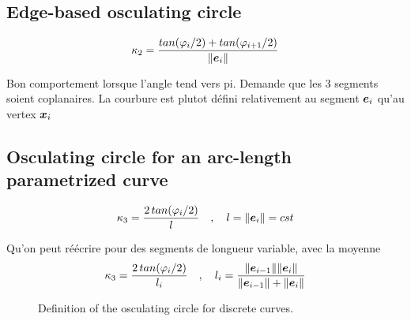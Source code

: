 \subsection{Edge-based osculating circle}

\begin{equation}
	\kappa_2 = \frac{tan(\varphi_i/2) + tan(\varphi_{i+1}/2)}{\lVert\boldsymbol{e}_{i}\rVert}
\end{equation}

Bon comportement lorsque l'angle tend vers pi. Demande que les 3 segments soient coplanaires.
La courbure est plutot défini relativement au segment $\boldsymbol{e}_i$ qu'au vertex $\boldsymbol{x}_i$

\subsection{Osculating circle for an arc-length parametrized curve}

\begin{equation}
	\kappa_3 = \frac{2 \,tan(\varphi_i/2)}{l}
	\quad , \quad 
	l = \lVert\boldsymbol{e}_{i}\rVert= cst
\end{equation}

Qu'on peut réécrire pour des segments de longueur variable, avec la moyenne
\begin{equation}
	\kappa_3 = \frac{2 \,tan(\varphi_i/2)}{l_i}
	\quad , \quad 
	l_i = \frac{\lVert\boldsymbol{e}_{i-1}\rVert \lVert\boldsymbol{e}_{i}\rVert}{\lVert\boldsymbol{e}_{i-1}\rVert + \lVert\boldsymbol{e}_{i}\rVert}
\end{equation}


\begin{figure}[h]
     \label{steady_state}
     \centering
     \caption{Definition of the osculating circle for discrete curves.}
\end{figure}

